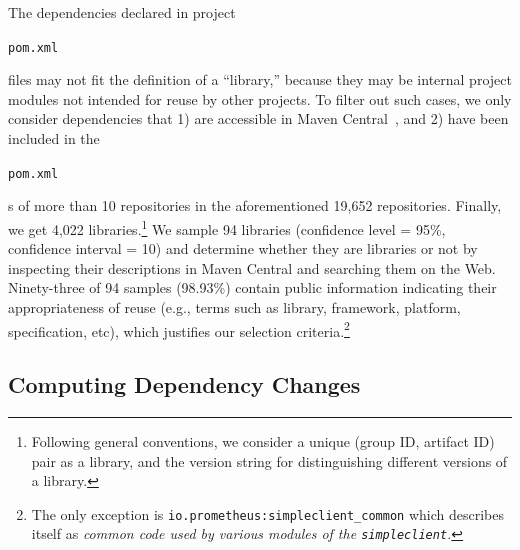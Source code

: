 \documentclass[sigconf, screen]{acmart}
\newcommand{\Code}[1]{\begin{small}\texttt{#1}\end{small}}
\begin{document}
The dependencies declared in project \Code{pom.xml} files may not fit the definition of a ``library,'' because they may be internal project modules not intended for reuse by other projects.
To filter out such cases, we only consider dependencies that 1) are accessible in Maven Central~\cite{Maven}, and 2) have been included in the \Code{pom.xml}s of more than 10 repositories in the aforementioned 19,652 repositories.
Finally, we get 4,022 libraries.\footnote{
Following general conventions, we consider a unique (group ID, artifact ID) pair as a library, and the version string for distinguishing different versions of a library.
}
We sample 94 libraries (confidence level = 95\%, confidence interval = 10) and determine whether they are libraries or not by inspecting their descriptions in Maven Central and searching them on the Web. 
Ninety-three %
of 94 samples (98.93\%) contain public information indicating their appropriateness of reuse (e.g., terms such as library, framework, platform, specification, etc), which justifies our selection criteria.\footnote{
The only exception is \texttt{io.prometheus:simpleclient\_common} which describes itself as \textit{common code used by various modules of the \texttt{simpleclient}.}}

\subsection{Computing Dependency Changes}
\label{sec:depchg}
\end{document}

